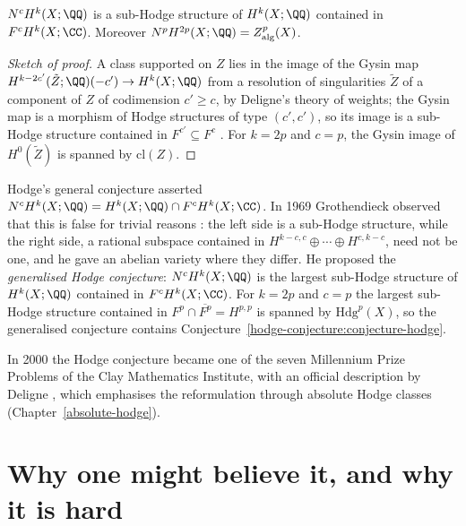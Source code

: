 \begin{proposition}\label{hodge-conjecture:proposition-coniveau}
$N^cH^k(X; \QQ)$ is a sub-Hodge structure of $H^k(X; \QQ)$ contained in $F^cH^k(X; \CC)$. Moreover $N^pH^{2p}(X; \QQ) = Z^p_{\mathrm{alg}}(X)$.
\end{proposition}

\begin{proof}[Sketch of proof]
A class supported on $Z$ lies in the image of the Gysin map $H^{k-2c'}(\tilde Z; \QQ)(-c') \to H^k(X; \QQ)$ from a resolution of singularities $\tilde Z$ of a component of $Z$ of codimension
$c' \geq c$, by Deligne's theory of weights; the Gysin map is a morphism of Hodge structures of type $(c', c')$, so its image
is a sub-Hodge structure contained in $F^{c'} \subseteq F^c$ \cite{deligne-hodge-2}. For $k = 2p$ and $c = p$, the Gysin image of $H^0(\tilde Z)$ is spanned by $\mathrm{cl}(Z)$.
\end{proof}

\begin{remark}\label{hodge-conjecture:remark-grothendieck}
Hodge's general conjecture asserted $N^cH^k(X; \QQ) = H^k(X; \QQ) \cap F^cH^k(X; \CC)$. In 1969 Grothendieck observed that this is false for trivial reasons \cite{grothendieck-1969}: the left side is a
sub-Hodge structure, while the right side, a rational subspace contained in $H^{k-c,c} \oplus \cdots \oplus H^{c,k-c}$, need not be one, and he gave an abelian variety where they differ. He
proposed the \emph{generalised Hodge conjecture}: $N^cH^k(X; \QQ)$ is the largest sub-Hodge structure of $H^k(X; \QQ)$ contained in $F^cH^k(X; \CC)$. For $k = 2p$ and $c = p$ the largest
sub-Hodge structure contained in $F^p \cap \overline{F^p} = H^{p,p}$ is spanned by $\mathrm{Hdg}^p(X)$, so the generalised conjecture contains Conjecture~\ref{hodge-conjecture:conjecture-hodge}.
\end{remark}

\begin{remark}\label{hodge-conjecture:remark-clay}
In 2000 the Hodge conjecture became one of the seven Millennium Prize Problems of the Clay Mathematics Institute, with an official description by Deligne \cite{deligne-clay}, which emphasises
the reformulation through absolute Hodge classes (Chapter~\ref{absolute-hodge}).
\end{remark}

\section{Why one might believe it, and why it is hard}\label{hodge-conjecture:section-evidence}

